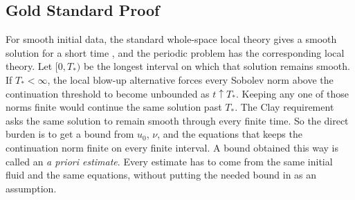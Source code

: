 \subsection{Gold Standard Proof}\label{sub:GoldStandardProof}

For smooth initial data, the standard whole-space local theory gives a smooth solution for a short time \parencite{Kato1984}, and the periodic problem has the corresponding local theory.
Let \([0,T_*)\) be the longest interval on which that solution remains smooth.
If \(T_*<\infty\), the local blow-up alternative forces every Sobolev norm above the continuation threshold to become unbounded as \(t\uparrow T_*\).
Keeping any one of those norms finite would continue the same solution past \(T_*\).
The Clay requirement asks the same solution to remain smooth through every finite time.
So the direct burden is to get a bound from \(u_0\), \(\nu\), and the equations that keeps the continuation norm finite on every finite interval.
A bound obtained this way is called an \emph{a priori estimate}.
Every estimate has to come from the same initial fluid and the same equations, without putting the needed bound in as an assumption.

